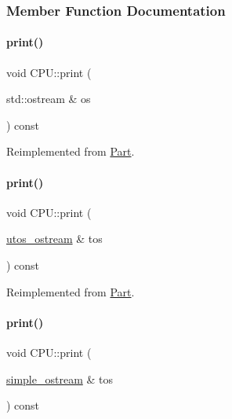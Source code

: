 \subsubsection{Member Function Documentation}
\mbox{\label{class_c_p_u_ad4d3ebb288deeaad640e034bdb71a40a}} 
\paragraph{\texorpdfstring{print()}{print()}\hspace{0.1cm}{\footnotesize\ttfamily [1/4]}}
{\footnotesize\ttfamily void C\+P\+U\+::print (\begin{DoxyParamCaption}\item[{std\+::ostream \&}]{os }\end{DoxyParamCaption}) const\hspace{0.3cm}{\ttfamily [virtual]}}



Reimplemented from \mbox{\hyperlink{class_part_a4fa402b8e8fd4236ff773a7697ab2bc3}{Part}}.

\mbox{\label{class_c_p_u_a0aea700bac0896b9e4434770737078d0}} 
\paragraph{\texorpdfstring{print()}{print()}\hspace{0.1cm}{\footnotesize\ttfamily [2/4]}}
{\footnotesize\ttfamily void C\+P\+U\+::print (\begin{DoxyParamCaption}\item[{\mbox{\hyperlink{structutos__ostream}{utos\+\_\+ostream}} \&}]{tos }\end{DoxyParamCaption}) const\hspace{0.3cm}{\ttfamily [virtual]}}



Reimplemented from \mbox{\hyperlink{class_part_a9ecabe44ba3415badf82c6a23617a41e}{Part}}.

\mbox{\label{class_c_p_u_a2f130a0263e32387554c128aedb6f9ed}} 
\paragraph{\texorpdfstring{print()}{print()}\hspace{0.1cm}{\footnotesize\ttfamily [3/4]}}
{\footnotesize\ttfamily void C\+P\+U\+::print (\begin{DoxyParamCaption}\item[{\mbox{\hyperlink{structsimple__ostream}{simple\+\_\+ostream}} \&}]{tos }\end{DoxyParamCaption}) const\hspace{0.3cm}{\ttfamily [virtual]}}



